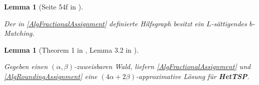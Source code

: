 \documentclass[a4paper,ngerman,12pt,bibtotoc]{scrartcl}
\theoremstyle{definition}
\theoremstyle{plain}
\newtheorem{lemma}[defn]{Lemma}
\theoremstyle{remark}
\newcommand{\HetTSP}{\textbf{HetTSP}}
\begin{document}
\begin{minipage}{0.45\textwidth}
		\begin{lemma}[Seite 54f in \cite{bMatching}]~
			
			Der in \cref{AlgFractionalAssignment} definierte Hilfsgraph besitzt ein $L$-sättigendes $b$-Matching.
		\end{lemma}

		\begin{lemma}[Theorem 1 in \cite{Rounding}, Lemma 3.2 in \cite{HetCVRP}]~
			
			Gegeben einen $(\alpha, \beta)$-zuweisbaren Wald, liefern \cref{AlgFractionalAssignment} und \cref{AlgRoundingAssignment} eine $(4\alpha+2\beta)$-approximative Lösung für \HetTSP.
		\end{lemma}
	\end{minipage}
	
\end{document}

